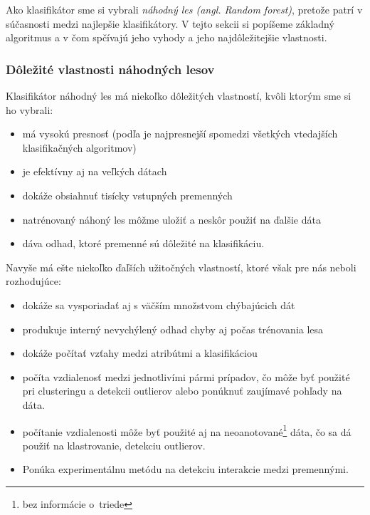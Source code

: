 

Ako klasifikátor sme si vybrali \textit{náhodný les (angl. Random forest)}, pretože patrí v súčasnosti medzi najlepšie klasifikátory. V tejto sekcii si popíšeme základný algoritmus a v čom spčívajú jeho vyhody a jeho najdôležitejšie vlastnosti.


\subsubsection[Dôležité vlastnosti]{Dôležité vlastnosti náhodných lesov}
Klasifikátor náhodný les má niekoľko dôležitých vlastností, kvôli ktorým sme si ho vybrali:
\begin{itemize}
\item má vysokú presnosť (podľa \cite{randomForest} je najpresnejší spomedzi všetkých vtedajších klasifikačných algoritmov)
\item je efektívny aj na veľkých dátach
\item dokáže obsiahnuť tisícky vstupných premenných
\item natrénovaný náhoný les môžme uložiť a neskôr použiť na ďalšie dáta
\item dáva odhad, ktoré premenné sú dôležité na klasifikáciu.
\end{itemize}

Navyše má ešte niekoľko ďaľších užitočných vlastností, ktoré však pre nás neboli rozhodujúce:

\begin{itemize}
\item dokáže sa vysporiadať aj s väčším množstvom chýbajúcich dát
\item produkuje interný nevychýlený odhad chyby aj počas trénovania lesa
\item dokáže počítať vzťahy medzi atribútmi a klasifikáciou
\item počíta vzdialenosť medzi jednotlivími pármi prípadov, čo môže byť použité pri clusteringu a detekcii outlierov alebo ponúknuť zaujímavé pohľady na dáta.
\item počítanie vzdialenosti môže byť použité aj na neoanotované\footnote{bez informácie o~triede} dáta, čo sa dá použiť na klastrovanie, detekciu outlierov.
\item Ponúka experimentálnu metódu na detekciu interakcie medzi premennými.
\end{itemize}

